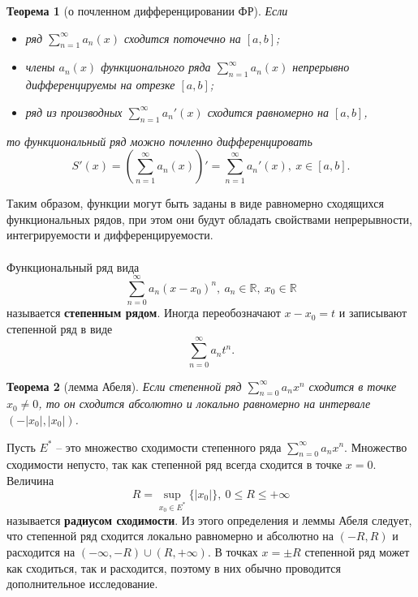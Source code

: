 \documentclass[a4paper, 12pt]{report}
\numberwithin{equation}{section}
\renewcommand{\leq}{\leqslant}
\newtheorem*{theorem}{Теорема}
\begin{document}
	\begin{theorem}
		[о почленном дифференцировании ФР]
		Если
		\begin{itemize}
			\item ряд $\sum_{n=1}^\infty a_n(x)$ сходится поточечно на $[a,b]$;
			\item члены $a_n(x)$ функционального ряда $\sum_{n=1}^\infty a_n(x)$ непрерывно дифференцируемы на отрезке $[a,b]$;
			\item ряд из производных $\sum_{n=1}^\infty a_n'(x)$ сходится равномерно на $[a,b]$,
		\end{itemize}
		то функциональный ряд можно почленно дифференцировать
		\begin{equation}
			S'(x) = \left(\sum_{n=1}^\infty a_n(x)\right)' = \sum_{n=1}^\infty a_n'(x),\ x \in [a,b].
		\end{equation}
	\end{theorem}
	\noindent 
	Таким образом, функции могут быть заданы в виде равномерно сходящихся функциональных рядов, при этом они будут обладать свойствами непрерывности, интегрируемости и дифференцируемости.\\\\
	Функциональный ряд вида
	\begin{equation*}
		\sum_{n=0}^\infty a_n(x-x_0)^n,\ a_n \in \mathbb R,\ x_0 \in \mathbb R
	\end{equation*}
	называется \textbf{степенным рядом}. Иногда переобозначают $x - x_0 = t$ и записывают степенной ряд в виде 
	\begin{equation*}
		\sum_{n=0}^\infty a_n t^n.
	\end{equation*}
	\begin{theorem}
		[лемма Абеля]
		Если степенной ряд $\sum_{n=0}^\infty a_n x^n$ сходится в точке $x_0\ne 0$, то он сходится абсолютно и локально равномерно на интервале $(-|x_0|, |x_0|)$. 
	\end{theorem}
	\noindent
	Пусть $E^*$ -- это множество сходимости степенного ряда $\sum_{n=0}^\infty a_n x^n$. Множество сходимости непусто, так как степенной ряд всегда сходится в точке $x = 0$. Величина
	\begin{equation*}
		R = \underset{x_0 \in E^*}{\sup}\{|x_0|\},\ 0 \leq R \leq +\infty
	\end{equation*}
	называется \textbf{радиусом сходимости}. Из этого определения и леммы Абеля следует, что степенной ряд сходится локально равномерно и абсолютно на $(-R, R)$ и расходится на $(-\infty, -R) \cup (R, +\infty)$. В точках $x = \pm R$ степенной ряд может как сходиться, так и расходится, поэтому в них обычно проводится дополнительное исследование.
\end{document}

